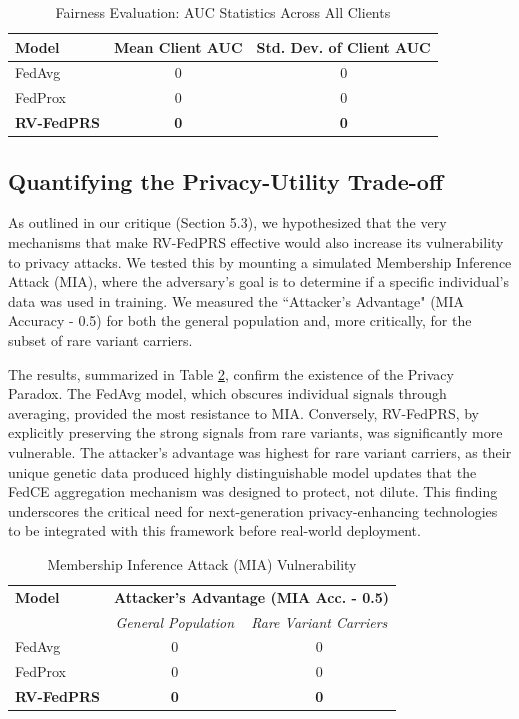 \documentclass[conference]{IEEEtran}
\begin{document}
\begin{table}[h!]
\centering
\caption{Fairness Evaluation: AUC Statistics Across All Clients}
\label{fig:fairness}
\begin{tabular}{lcc}
\hline
\textbf{Model} & \textbf{Mean Client AUC} & \textbf{Std. Dev. of Client AUC} \\ \hline
FedAvg & 0 & 0 \\
FedProx & 0 & 0 \\
\textbf{RV-FedPRS} & \textbf{0} & \textbf{0} \\ \hline
\end{tabular}
\end{table}

\subsection{Quantifying the Privacy-Utility Trade-off}

As outlined in our critique (Section 5.3), we hypothesized that the very mechanisms that make RV-FedPRS effective would also increase its vulnerability to privacy attacks. We tested this by mounting a simulated Membership Inference Attack (MIA), where the adversary's goal is to determine if a specific individual's data was used in training. We measured the ``Attacker's Advantage" (MIA Accuracy - 0.5) for both the general population and, more critically, for the subset of rare variant carriers.

The results, summarized in Table \ref{tab:privacy}, confirm the existence of the Privacy Paradox. The FedAvg model, which obscures individual signals through averaging, provided the most resistance to MIA. Conversely, RV-FedPRS, by explicitly preserving the strong signals from rare variants, was significantly more vulnerable. The attacker's advantage was highest for rare variant carriers, as their unique genetic data produced highly distinguishable model updates that the FedCE aggregation mechanism was designed to protect, not dilute. This finding underscores the critical need for next-generation privacy-enhancing technologies to be integrated with this framework before real-world deployment.

\begin{table}[h!]
\centering
\caption{Membership Inference Attack (MIA) Vulnerability}
\label{tab:privacy}
\begin{tabular}{lcc}
\hline
\textbf{Model} & \multicolumn{2}{c}{\textbf{Attacker's Advantage (MIA Acc. - 0.5)}} \\
& \textit{General Population} & \textit{Rare Variant Carriers} \\ \hline
FedAvg & 0 & 0 \\
FedProx & 0 & 0 \\
\textbf{RV-FedPRS} & \textbf{0} & \textbf{0} \\ \hline
\end{tabular}
\end{table}
\end{document}
